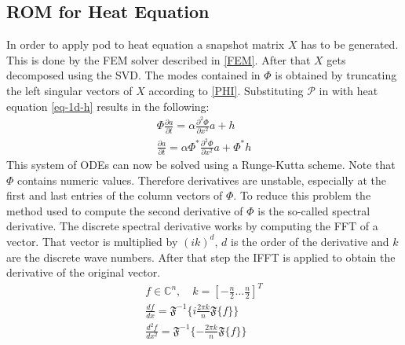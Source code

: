 \subsection{ROM for Heat Equation}
In order to apply pod to heat equation a snapshot matrix \(X\) has to be generated.
This is done by the FEM solver described in \ref{FEM}.
After that \(X\) gets decomposed using the SVD.
The modes contained in \(\Phi\) is obtained by truncating the left singular vectors of \(X\) according to \ref{PHI}.
Substituting \(\mathscr{P}\) in \label{label-u-aprox} with heat equation \ref{eq-1d-h} results in the following:
\begin{gather}
\Phi \frac{\partial a}{\partial t}  = \alpha \frac{\partial^{2} \Phi}{\partial x^{2}} a + h\\
\frac{\partial a}{\partial t} = \alpha \Phi^{*}  \frac{\partial^{2} \Phi}{\partial x^{2}} a + \Phi^{*}h
\end{gather}
This system of ODEs can now be solved using a Runge-Kutta scheme.
Note that \(\Phi\) contains numeric values.
Therefore derivatives are unstable, especially at the first and last entries of the column vectors of \(\Phi\).
To reduce this problem the method used to compute the second derivative of \(\Phi\) is the so-called spectral derivative.
The discrete spectral derivative works by computing the FFT of a vector.
That vector is multiplied by \((ik)^{d}\), \(d\) is the order of the derivative and \(k\) are the discrete wave numbers.
After that step the IFFT is applied to obtain the derivative of the original vector.
\begin{gather}
f \in \mathbb{C}^{n}, \quad k = [-\frac{n}{2} \hdots \frac{n}{2}]^{T} \\
\frac{df}{dx} = \mathfrak{F}^{-1}\{i \frac{2 \pi k}{n} \mathfrak{F}\{f\}\} \\
\frac{d^{2}f}{dx^{2}} = \mathfrak{F}^{-1}\{-\frac{2 \pi k}{n} \mathfrak{F}\{f\}\} \\
\end{gather}
\cite{brunton_kutz_2019f}


